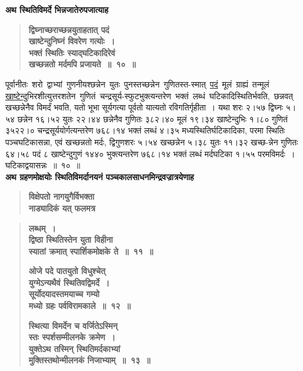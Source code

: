 \documentclass[11pt, openany]{book}
\begin{document}
\newpage

{\small \textbf{अथ स्थितिविमर्दे भिन्नजातेरुपजात्याह\textendash }}

 \label{4.10}
\begin{quote}
{\large \textbf{{\color{purple}द्विघ्नाच्छराच्छन्नयुताहतात् पदं \\
खाष्टेन्दुनिघ्नं विवरेण गत्योः~। \\
भक्तं स्थितिः स्याद्घटिकादिरेवं \\
खच्छन्नतो मर्दमपि प्रजायते~॥~१०~॥}}}
\end{quote}

पूर्वानीतः \,शरो \,द्वाभ्यां \,गुणनीयश्छन्नेन \,युतः \,पुनस्तच्छन्नेन \,गुणितस्त-स्मात् \,\hyperref[4.10]{पदं} \,मूलं \,ग्राह्यं \,तन्मूलं \,\hyperref[4.10]{खाष्टेन्दु}भिरशीत्युत्तरशतेन \,गुणितं \,चन्द्रसूर्य-स्फुटभुक्त्यन्तरेण \,भक्तं \,लब्धं \,घटिकादिस्थितिर्भवति, \,छन्नवत् \,खच्छन्नेनैव विमर्दं भवति, यतो भूभा सूर्यगत्या पूर्वतो यात्यतो रविगतिर्गृहीता~। यथा शरः २।५७ द्विघ्नः ५।५४ छन्नेन १६।५२ युतः २२।४४ छन्नेनैव गुणितः ३८२।४० मूलं १९।३४ खाष्टेन्दुभिः १।८० गुणितं ३५२२।० चन्द्रसूर्ययोर्गत्यन्तरेण ७६८।१४ भक्तं लब्धं ४।३५ मध्यस्थितिर्घटिकादिका, परमा स्थितिः पञ्चघटिकासन्ना, एवं खच्छन्नतो मर्दः, द्विगुणशरः ५।५४ खच्छन्नेन ५।३८ युतः ११।३२ खच्छ-न्नेन गुणितः ६४।५८ पदं ८ खाष्टेन्दुगुणं १४४० भुक्त्यन्तरेण ७६८।१४ भक्तं लब्धं मर्दघटिका १।५५ परमविमर्दः~। घटिकाद्वयासन्नः~॥~१०~॥\\

{\small \textbf{अथ ग्रहणमोक्षयोः स्थितिविमर्दानयनं पञ्चकालसाधनमिन्द्रवज्रात्रयेणाह\textendash }}

 \label{4.11.1}
\begin{quote}
{\large \textbf{{\color{purple}विक्षेपतो नागयुगैर्विभक्ता \\
नाड्यादिकं यत् फलमत्र}}}
\end{quote}

\newpage

 \label{4.11}
\begin{quote}
{\large \textbf{{\color{purple}लब्धम्~। \\
द्विष्ठा स्थितिस्तेन युता विहीना \\
स्यातां क्रमात् स्पार्शिकमोक्षके ते~॥~११~॥}}
\vspace{1mm}

 \label{4.12}
\textbf{{\color{purple}ओजे पदे पातयुतो विधुश्चेत् \\
युग्मेऽन्यथैवं स्थितिवद्विमर्दे~। \\
सूर्योदयादस्तमयाच्च गम्यो \\
मध्यो ग्रहः पर्वविरामकाले~॥~१२~॥}}
\vspace{1mm}

 \label{4.13}
\textbf{{\color{purple}स्थित्या विमर्देन च वर्जितेऽस्मिन् \\
स्तः स्पर्शसम्मीलनके क्रमेण~। \\
युक्तेऽथ तस्मिन् स्थितिमर्दकाभ्यां \\
मुक्तिस्तथोन्मीलनकं निजाभ्याम्~॥~१३~॥}}}
\end{quote}
\end{document}

